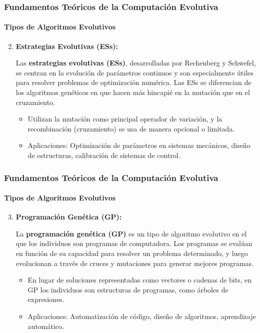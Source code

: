 \documentclass[
	11pt, %
]{beamer}
\begin{document}
\begin{frame}
	\frametitle{Fundamentos Teóricos de la Computación Evolutiva}
	\framesubtitle{Tipos de Algoritmos Evolutivos}
	\begin{enumerate}
		\setcounter{enumi}{1}
		\item \textbf{Estrategias Evolutivas (ESs):}
		
		Las \textbf{estrategias evolutivas (ESs)}, desarrolladas por Rechenberg y Schwefel, se centran en la evolución de parámetros continuos y son especialmente útiles para resolver problemas de optimización numérica. Las ESs se diferencian de los algoritmos genéticos en que hacen más hincapié en la mutación que en el cruzamiento.
		
		\begin{itemize}
			\item Utilizan la mutación como principal operador de variación, y la recombinación (cruzamiento) se usa de manera opcional o limitada.
			\item Aplicaciones: Optimización de parámetros en sistemas mecánicos, diseño de estructuras, calibración de sistemas de control.
		\end{itemize}
	\end{enumerate}
\end{frame}

\begin{frame}
	\frametitle{Fundamentos Teóricos de la Computación Evolutiva}
	\framesubtitle{Tipos de Algoritmos Evolutivos}
	\begin{enumerate}
		\setcounter{enumi}{2}
		\item \textbf{Programación Genética (GP):}
		
		La \textbf{programación genética (GP)} es un tipo de algoritmo evolutivo en el que los individuos son programas de computadora. Los programas se evalúan en función de su capacidad para resolver un problema determinado, y luego evolucionan a través de cruces y mutaciones para generar mejores programas.
		
		\begin{itemize}
			\item En lugar de soluciones representadas como vectores o cadenas de bits, en GP los individuos son estructuras de programas, como árboles de expresiones.
			\item Aplicaciones: Automatización de código, diseño de algoritmos, aprendizaje automático.
		\end{itemize}
	\end{enumerate}
\end{frame}
\end{document}
